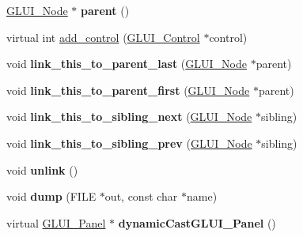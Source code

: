 \begin{DoxyCompactItemize}
\item 
\hypertarget{class_g_l_u_i___node_a8ed65d447784f6f88bd3e2e2bcac6cdb}{\hyperlink{class_g_l_u_i___node}{G\+L\+U\+I\+\_\+\+Node} $\ast$ {\bfseries parent} ()}\label{class_g_l_u_i___node_a8ed65d447784f6f88bd3e2e2bcac6cdb}

\item 
virtual int \hyperlink{class_g_l_u_i___node_afa7031b826994d524f219ea5016c113c}{add\+\_\+control} (\hyperlink{class_g_l_u_i___control}{G\+L\+U\+I\+\_\+\+Control} $\ast$control)
\item 
\hypertarget{class_g_l_u_i___node_a28eb5c7bf5a0edf5b7ba2502384c6544}{void {\bfseries link\+\_\+this\+\_\+to\+\_\+parent\+\_\+last} (\hyperlink{class_g_l_u_i___node}{G\+L\+U\+I\+\_\+\+Node} $\ast$parent)}\label{class_g_l_u_i___node_a28eb5c7bf5a0edf5b7ba2502384c6544}

\item 
\hypertarget{class_g_l_u_i___node_a3feadb4b6d58122ff5449adfb4a323bc}{void {\bfseries link\+\_\+this\+\_\+to\+\_\+parent\+\_\+first} (\hyperlink{class_g_l_u_i___node}{G\+L\+U\+I\+\_\+\+Node} $\ast$parent)}\label{class_g_l_u_i___node_a3feadb4b6d58122ff5449adfb4a323bc}

\item 
\hypertarget{class_g_l_u_i___node_ad8d7fd8a437eeec4a72b73064dc954b4}{void {\bfseries link\+\_\+this\+\_\+to\+\_\+sibling\+\_\+next} (\hyperlink{class_g_l_u_i___node}{G\+L\+U\+I\+\_\+\+Node} $\ast$sibling)}\label{class_g_l_u_i___node_ad8d7fd8a437eeec4a72b73064dc954b4}

\item 
\hypertarget{class_g_l_u_i___node_a5825555fc493712a1d6f24235f59f25a}{void {\bfseries link\+\_\+this\+\_\+to\+\_\+sibling\+\_\+prev} (\hyperlink{class_g_l_u_i___node}{G\+L\+U\+I\+\_\+\+Node} $\ast$sibling)}\label{class_g_l_u_i___node_a5825555fc493712a1d6f24235f59f25a}

\item 
\hypertarget{class_g_l_u_i___node_a48b62b12bf8c466fc54fbbbf30183493}{void {\bfseries unlink} ()}\label{class_g_l_u_i___node_a48b62b12bf8c466fc54fbbbf30183493}

\item 
\hypertarget{class_g_l_u_i___node_abce29cf0ade68e9e5702025f710cb1e8}{void {\bfseries dump} (F\+I\+L\+E $\ast$out, const char $\ast$name)}\label{class_g_l_u_i___node_abce29cf0ade68e9e5702025f710cb1e8}

\item 
\hypertarget{class_g_l_u_i___node_ad23b4cccd7c5a3795974d803e6e4e25b}{virtual \hyperlink{class_g_l_u_i___panel}{G\+L\+U\+I\+\_\+\+Panel} $\ast$ {\bfseries dynamic\+Cast\+G\+L\+U\+I\+\_\+\+Panel} ()}\label{class_g_l_u_i___node_ad23b4cccd7c5a3795974d803e6e4e25b}


\end{DoxyCompactItemize}
